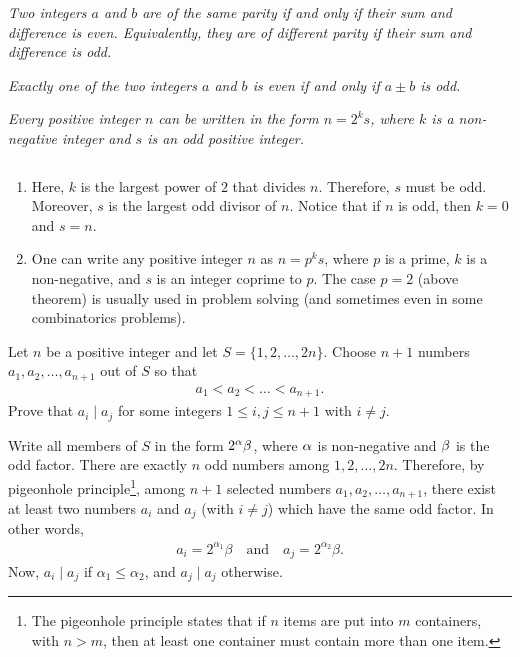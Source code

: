 \documentclass{subfile}
\begin{document}
	\begin{theorem}\slshape
		Two integers $a$ and $b$ are of the same parity if and only if their sum and difference is even. Equivalently, they are of different parity if their sum and difference is odd.
	\end{theorem}

	\begin{corollary}\slshape\label{cor:sumparity}
		Exactly one of the two integers $a$ and $b$ is even if and only if $a\pm b$ is odd.
	\end{corollary}

	\begin{theorem}\slshape\label{thm:factorizeintopowersoftwo}
		Every positive integer $n$ can be written in the form $n=2^ks$, where $k$ is a non-negative integer and $s$ is an odd positive integer.
	\end{theorem}

	\begin{note}
		$ $
		\begin{enumerate}
			\item Here, $k$ is the largest power of $2$ that divides $n$. Therefore, $s$ must be odd. Moreover, $s$ is the largest odd divisor of $n$. Notice that if $n$ is odd, then $k=0$ and $s=n$.
			\item  One can write any positive integer $n$ as $n=p^ks$, where $p$ is a prime, $k$ is a non-negative, and $s$ is an integer coprime to $p$. The case $p=2$ (above theorem) is usually used in problem solving (and sometimes even in some combinatorics problems).
		\end{enumerate}
	\end{note}

	\begin{problem}
		Let $n$ be a positive integer and let $S=\{1,2,\dots,2n\}$. Choose $n+1$ numbers $a_1,a_2,\dots, a_{n+1}$ out of $S$ so that
		\begin{align*}
			a_1<a_2<\dots <a_{n+1}.
		\end{align*}
		Prove that $a_i\mid a_j$ for some integers $1 \leq i,j \leq n+1$ with $i\neq j$.
	\end{problem}

	\begin{solution}
		Write all members of $S$ in the form $2^{\alpha}\beta$, where $\alpha$ is non-negative and $\beta$ is the odd factor. There are exactly $n$ odd numbers among $1,2,\dots,2n$. Therefore, by pigeonhole principle\footnote{The pigeonhole principle states that if $n$ items are put into $m$ containers, with $n > m$, then at least one container must contain more than one item.}, among $n+1$ selected numbers $a_1,a_2,\dots, a_{n+1}$, there exist at least two numbers $a_i$ and $a_j$ (with $i\neq j$) which have the same odd factor. In other words,
		\begin{align*}
			a_i = 2^{\alpha_1}\beta \quad \text{and} \quad a_j = 2^{\alpha_2}\beta.
		\end{align*}
		Now, $a_i\mid a_j$ if $\alpha_1\leq \alpha_2$, and $a_j\mid a_j$ otherwise.
	\end{solution}
\end{document}
